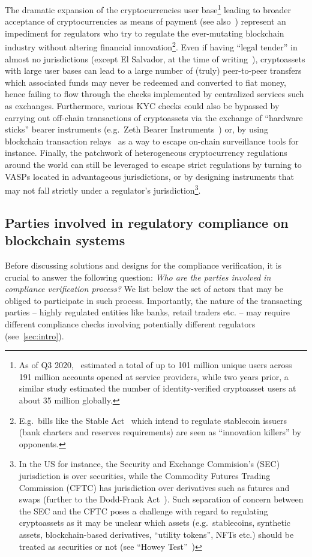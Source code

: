 \documentclass[runningheads,10pt]{llncs}
\numberwithin{equation}{section}
\begin{document}
The dramatic expansion of the cryptocurrencies user base\footnote{As of Q3
  2020,~\cite{cryptoasset-benchmark} estimated a total of up to 101 million
  unique users across 191 million accounts opened at service providers, while
  two years prior, a similar study estimated the number of identity-verified
  cryptoasset users at about 35 million globally.}  leading to broader
  acceptance of cryptocurrencies as means of payment (see
  also~\cite{bloomberg-zug-crypto-tax,bbc-btc-legal-tender}) represent an
  impediment for regulators who try to regulate the ever-mutating blockchain
  industry without altering financial innovation\footnote{E.g.~bills like the
  Stable Act~\cite{stable-act-draft} which intend to regulate stablecoin
  issuers (bank charters and reserves requirements) are seen as ``innovation
  killers'' by opponents.}.  Even if having ``legal tender'' in almost no
  jurisdictions (except El Salvador, at the time of
  writing~\cite{bbc-btc-legal-tender}), cryptoassets with large user bases can
  lead to a large number of (truly) peer-to-peer transfers which associated
  funds may never be redeemed and converted to fiat money, hence failing to
  flow through the checks implemented by centralized services such as
  exchanges.
  Furthermore, various KYC checks could also be bypassed by carrying out
  off-chain transactions of cryptoassets via the exchange of ``hardware
  sticks'' bearer instruments (e.g.~Zeth Bearer Instruments~\cite{zbi-article}) or, by using blockchain transaction
  relays~\cite{zeth-relay} as a way to escape on-chain surveillance tools for
  instance. Finally, the patchwork of heterogeneous cryptocurrency regulations
  around the world can still be leveraged to escape strict regulations by
  turning to VASPs located in advantageous jurisdictions, or by designing
  instruments that may not fall strictly under a regulator's
  jurisdiction\footnote{In the US for instance, the Security and Exchange
  Commision's (SEC) jurisdiction is over securities, while the Commodity
  Futures Trading Commission (CFTC) has jurisdiction over derivatives such as
  futures and swaps (further to the Dodd-Frank Act~\cite{cftc-dodd-frank}).
  Such separation of concern between the SEC and the CFTC poses a challenge
  with regard to regulating cryptoassets as it may be unclear which assets
  (e.g.~stablecoins, synthetic assets, blockchain-based derivatives, ``utility
  tokens'', NFTs etc.) should be treated as securities or not (see ``Howey Test''~\cite{sec-howey})}.

\subsection{Parties involved in regulatory compliance on blockchain systems}
Before discussing solutions and designs for the compliance verification, it is
crucial to answer the following question: \emph{Who are the parties involved in
compliance verification process?}  We list below the set of actors that may be
obliged to participate in such process. Importantly, the nature of
the transacting parties -- highly regulated entities like banks, retail traders etc. --
may require different compliance checks involving potentially different
regulators (see~\cref{sec:intro}).
\end{document}
